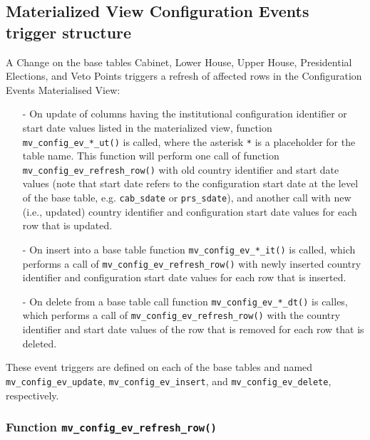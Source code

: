 \subsection{Materialized View Configuration Events trigger structure}\label{subsec_trigger_structure_mv_config_ev}


A Change on the base tables Cabinet, Lower House, Upper House, Presidential Elections, and Veto Points triggers a refresh of affected rows in the Configuration Events Materialised View:
\begin{itemize}

\item[-]{On update of columns having the institutional configuration identifier or start date values listed in the materialized view, function \texttt{mv\_config\_ev\_*\_ut()} is called, where the asterisk \texttt{*} is a placeholder for the table name.
This function will perform one call of function \texttt{mv\_config\_ev\_refresh\_row()} with old country identifier and start date values (note that start date refers to the configuration start date at the level of the base table, e.g. \texttt{cab\_sdate} or \texttt{prs\_sdate}), and another call with new (i.e., updated) country identifier and configuration start date values for each row that is updated.}

\item[-]{On insert into a base table function \texttt{mv\_config\_ev\_*\_it()} is called, which performs a call of \texttt{mv\_config\_ev\_refresh\_row()} with newly inserted country identifier and configuration start date values for each row that is inserted.}

\item[-]{On delete from a base table call function \texttt{mv\_config\_ev\_*\_dt()} is calles, which performs a call of \texttt{mv\_config\_ev\_refresh\_row()} with the country identifier and start date values of the row that is removed for each row that is deleted.}
\end{itemize}

These event triggers are defined on each of the base tables and named \texttt{mv\_config\_ev\_update}, \texttt{mv\_config\_ev\_insert}, and \texttt{mv\_config\_ev\_delete}, respectively. 

\subsubsection{Function \texttt{mv\_config\_ev\_refresh\_row()}}

